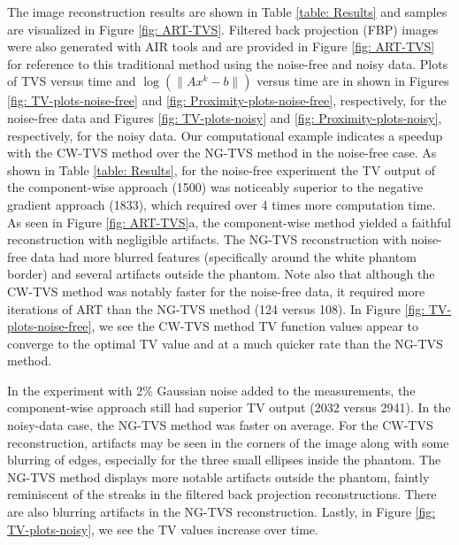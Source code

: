 \documentclass[smallextended]{svjour3}      %
\begin{document}
The image reconstruction results are shown in Table \ref{table: Results} and samples are visualized in Figure \ref{fig: ART-TVS}. Filtered back projection (FBP) images were also generated with AIR tools and are provided in Figure \ref{fig: ART-TVS} for reference to this traditional method using the noise-free and noisy data. Plots of TVS versus time and $\log(\|Ax^{k}-b\|)$ versus time are in shown in Figures \ref{fig: TV-plots-noise-free} and \ref{fig: Proximity-plots-noise-free}, respectively, for the noise-free data and Figures \ref{fig: TV-plots-noisy} and \ref{fig: Proximity-plots-noisy}, respectively, for the noisy data. Our computational example indicates a speedup with the CW-TVS method over the NG-TVS method in the noise-free case. As shown in Table \ref{table: Results}, for the noise-free experiment the TV output of the component-wise approach (1500) was noticeably superior to the negative gradient approach (1833), which required over 4 times more computation time. As seen in Figure \ref{fig: ART-TVS}a, the component-wise method yielded a faithful reconstruction with  negligible artifacts. The NG-TVS reconstruction with noise-free data had more blurred features (specifically around the white phantom border) and several artifacts outside the phantom. Note also that although the CW-TVS method was notably faster for the noise-free data, it required more iterations of ART than the NG-TVS method (124 versus 108). In Figure \ref{fig: TV-plots-noise-free}, we see the CW-TVS method TV function values appear to converge to the optimal TV value and at a much quicker rate than the NG-TVS method.

In the experiment with 2\% Gaussian noise added to the measurements, the component-wise approach still had superior TV output 	(2032 versus 2941). In the noisy-data case, the NG-TVS method was faster on average. For the CW-TVS reconstruction, artifacts may be seen in the corners of the image along with some blurring of edges, especially for the three small ellipses inside the phantom. The NG-TVS method displays more notable artifacts outside the phantom, faintly reminiscent of the streaks in the filtered back projection reconstructions. There are also blurring artifacts in the NG-TVS reconstruction. Lastly, in Figure \ref{fig: TV-plots-noisy}, we see the TV values increase over time.

\begin{figure*}
	\centering
	\caption{Plots of TV from a noise-free data trial used to create the images in Subfigures \ref{fig: ART-TVS}A and \ref{fig: ART-TVS}B.
	\label{fig: TV-plots-noise-free}}
\end{figure*}
\end{document}
